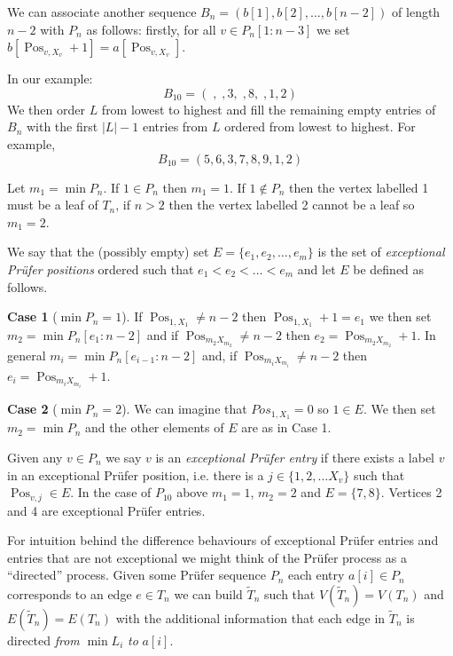 \documentclass[10pt]{article} %
\theoremstyle{definition}
\newtheorem{case}{Case}
\DeclareMathOperator{\Pos}{Pos}
\begin{document}
We can  associate another sequence $B_{n} = (b[1],b[2],\dots,b[n-2])$ of length $n-2$ with $P_{n}$ as follows:  firstly, for all $v \in P_{n}[1:n-3]$ we set $b[\Pos_{v,X_{v}} + 1] =  a[\Pos_{v,X_{v}}]$.

In our example: 
\[B_{10} = (\;,\;,3,\;,8,\;,1,2)\]
We then order $L$ from lowest to highest and fill the remaining empty entries of $B_{n}$ with the first $|L| - 1$ entries from $L$ ordered from lowest to highest.  For example,
\[B_{10} = (5,6,3,7,8,9,1,2)\] 
  
Let $m_{1} = \min P_{n}$.  If $1 \in P_{n}$ then $m_{1} = 1$.  If $1 \notin P_{n}$ then the vertex labelled 1 must be a leaf of $T_{n}$, if $n>2$ then the vertex labelled 2 cannot be a leaf so $m_{1} = 2$.   

We say that the (possibly empty) set $E = \{e_{1},e_{2},\dots,e_{m}\}$ is the set  of \emph{ exceptional Pr\"{u}fer positions} ordered such that $e_{1} < e_2 <\dots <e_m$ and let $E$ be defined as follows.  

\begin{case}[$\min P_{n} = 1$] If $\Pos_{1,X_{1}} \neq n-2$ then $\Pos_{1,X_{1}} + 1 = e_1$ we then set $m_{2} = \min P_{n}[e_{1} : n-2]$ and if 
$\Pos_{m_{2}X_{m_{2}}} \neq n-2$ then $e_2 = \Pos_{m_{2}X_{m_{2}}}  + 1$.  In general $m_i = \min P_{n}[e_{i - 1} :n-2]$ and, if $\Pos_{m_{i}X_{m_{i}}} \neq 
n-2$ then $e_{i} = \Pos_{m_{i}X_{m_{i}}} + 1$.
\end{case}
\begin{case}[$\min P_{n} = 2$] 
 We can imagine that $Pos_{1,X_{1}} = 0$ so $1 \in E$.  We then set $m_{2} = \min P_{n}$ and the other elements of $E$ are as in Case 1.  
\end{case}
Given any $v \in P_{n}$ we say $v$ is an \emph{exceptional Pr\"{u}fer entry} if there exists a label $v$ in an exceptional Pr\"{u}fer position, i.e. there is a $j \in \{1,2,\dots X_{v}\}$ such that  $\Pos_{v,j} \in E$.  In the case of $P_{10}$ above $m_{1} = 1$, $m_{2} = 2$ and $E = \{7,8\}$.  Vertices 2 and 4 are exceptional Pr\"{u}fer entries.       



For intuition behind the difference behaviours of exceptional Pr\"{u}fer entries and entries that are not exceptional  we might think of the Pr\"{u}fer process as a ``directed'' process. Given some Pr\"{u}fer sequence $P_{n}$ each entry $a[i] \in P_{n}$ corresponds to an edge $e \in T_{n}$ we can build $\tilde{T}_{n}$ such that $V(\tilde{T}_{n}) = V(T_{n})$ and $E(\tilde{T}_{n}) = E(T_{n})$ with the additional information that each edge in $\tilde{T}_{n}$ is directed \emph{from} $\min L_{i}$ \emph{to} $a[i]$. 
\end{document}
